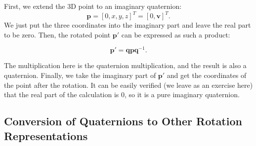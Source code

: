 First, we extend the 3D point to an imaginary quaternion:
\[
\mathbf{p} = [0, x, y, z]^T = [0, \mathbf{v}]^T. 
\]
We just put the three coordinates into the imaginary part and leave the real part to be zero. Then, the rotated point $ \mathbf {p}' $ can be expressed as such a product:

\begin{equation}\label{eq:rotate-with-quaternion}
\mathbf{p}' = \mathbf{q} \mathbf{p} \mathbf{q}^{-1}.
\end{equation}

The multiplication here is the quaternion multiplication, and the result is also a quaternion. Finally, we take the imaginary part of $ \mathbf{p}' $ and get the coordinates of the point after the rotation. It can be easily verified (we leave as an exercise here) that the real part of the calculation is 0, so it is a pure imaginary quaternion.

\subsection{Conversion of Quaternions to Other Rotation Representations}

